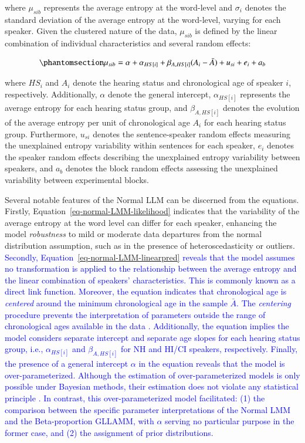 \documentclass[
  authoryear,
  preprint,
  1p]{elsarticle}
\begin{document}
where \(\mu_{sib}\) represents the average entropy at the word-level and
\(\sigma_{i}\) denotes the standard deviation of the average entropy at
the word-level, varying for each speaker. Given the clustered nature of
the data, \(\mu_{sib}\) is defined by the linear combination of
individual characteristics and several random effects:

\begin{equation}\phantomsection\label{eq-normal-LMM-linearpred}{
\mu_{sib} = \alpha + \alpha_{HS[i]} + \beta_{A, HS[i]} (A_{i} - \bar{A}) + u_{si} + e_{i} + a_{b}
}\end{equation}

where \(HS_{i}\) and \(A_{i}\) denote the hearing status and
chronological age of speaker \(i\), respectively. Additionally,
\(\alpha\) denote the general intercept, \(\alpha_{HS[i]}\) represents
the average entropy for each hearing status group, and
\(\beta_{A,HS[i]}\) denotes the evolution of the average entropy per
unit of chronological age \(A_{i}\) for each hearing status group.
Furthermore, \(u_{si}\) denotes the sentence-speaker random effects
measuring the unexplained entropy variability within sentences for each
speaker, \(e_{i}\) denotes the speaker random effects describing the
unexplained entropy variability between speakers, and \(a_{b}\) denotes
the block random effects assessing the unexplained variability between
experimental blocks.

Several notable features of the Normal LLM can be discerned from the
equations. Firstly, Equation~\ref{eq-normal-LMM-likelihood} indicates
that the variability of the average entropy at the word level can differ
for each speaker, enhancing the model \emph{robustness} to mild or
moderate data departures from the normal distribution assumption, such
as in the presence of heteroscedasticity or outliers. \textcolor{blue}{Secondly,
Equation~\ref{eq-normal-LMM-linearpred} reveals that the model assumes
no transformation is applied to the relationship between the average
entropy and the linear combination of speakers' characteristics. This is
commonly known as a direct link function. Moreover, the equation
indicates that chronological age is \emph{centered} around the minimum
chronological age in the sample \(\bar{A}\). The \emph{centering}
procedure prevents the interpretation of parameters outside the range of
chronological ages available in the data \citep{Everitt_et_al_2010}.
Additionally, the equation implies the model considers separate
intercept and separate age slopes for each hearing status group, i.e.,
\(\alpha_{HS[i]}\) and \(\beta_{A, HS[i]}\) for NH and HI/CI speakers,
respectively. Finally, the presence of a general intercept \(\alpha\) in
the equation reveals that the model is over-parameterized. Although the
estimation of over-parameterized models is only possible under Bayesian
methods, their estimation does not violate any statistical principle
\citep[pp.~345]{McElreath_2020}. In contrast, this over-parameterized
model facilitated: (1) the comparison between the specific parameter
interpretations of the Normal LMM and the Beta-proportion GLLAMM, with
\(\alpha\) serving no particular purpose in the former case, and (2) the
assignment of prior distributions.}
\end{document}
